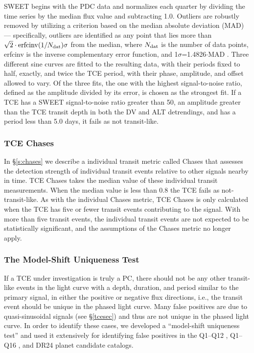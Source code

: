 SWEET begins with the PDC data and normalizes each quarter by dividing the time series by the median flux value and subtracting 1.0. Outliers are robustly removed by utilizing a criterion based on the median absolute deviation (MAD) --- specifically, outliers are identified as any point that lies more than $\sqrt{2}\cdot\mathrm{erfcinv}(1/N_{\rm dat})\sigma$ from the median, where $N_{\rm dat}$ is the number of data points, erfcinv is the inverse complementary error function, and 1$\sigma$=1.4826$\cdot$MAD \citep[see][]{Hampel1974,Ruppert2010}. Three different sine curves are fitted to the resulting data, with their periods fixed to half, exactly, and twice the TCE period, with their phase, amplitude, and offset allowed to vary. Of the three fits, the one with the highest signal-to-noise ratio, defined as the amplitude divided by its error, is chosen as the strongest fit. If a TCE has a SWEET signal-to-noise ratio greater than 50, an amplitude greater than the TCE transit depth in both the DV and ALT detrendings, and has a period less than 5.0 days, it fails as not transit-like.




\subsubsection{TCE Chases}
\label{s:tcechases}

In \S\ref{s:chases} we describe a individual transit metric called Chases that assesses the detection strength of individual transit events relative to other signals nearby in time. TCE Chases takes the median value of these individual transit measurements.  When the median value is less than 0.8 the TCE fails as not-transit-like.  As with the individual Chases metric, TCE Chases is only calculated when the TCE has five or fewer transit events contributing to the signal.  With more than five transit events, the individual transit events are not expected to be statistically significant, and the assumptions of the Chases metric no longer apply.


\subsubsection{The Model-Shift Uniqueness Test}
\label{s:ms}

If a TCE under investigation is truly a PC, there should not be any other transit-like events in the light curve with a depth, duration, and period similar to the primary signal, in either the positive or negative flux directions, i.e., the transit event should be unique in the phased light curve. Many false positives are due to quasi-sinusoidal signals (see \S\ref{tcesec}) and thus are not unique in the phased light curve. In order to identify these cases, we developed a ``model-shift uniqueness test'' and used it extensively for identifying false positives in the Q1--Q12 \citep{Rowe2015a}, Q1--Q16 \citep{Mullally2015cat}, and DR24 \citep{Coughlin2016} planet candidate catalogs.

